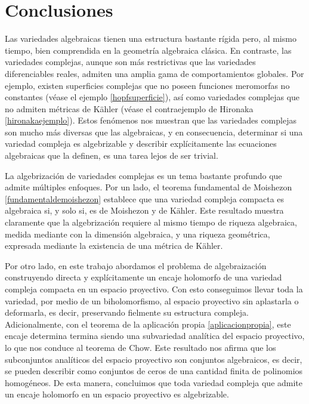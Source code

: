 \chapter*{Conclusiones}

Las variedades algebraicas tienen una estructura bastante rígida pero, al mismo tiempo, bien comprendida en la geometría algebraica clásica. En contraste, las variedades complejas, aunque son más restrictivas que las variedades diferenciables reales, admiten una amplia gama de comportamientos globales. Por ejemplo, existen superficies complejas que no poseen funciones meromorfas no constantes (véase el ejemplo \ref{hopfsuperficie}), así como variedades complejas que no admiten métricas de Kähler (véase el contraejemplo de Hironaka \ref{hironakaejemplo}). Estos fenómenos nos muestran que las variedades complejas son mucho más diversas que las algebraicas, y en consecuencia, determinar si una variedad compleja es algebrizable y describir explícitamente las ecuaciones algebraicas que la definen, es una tarea lejos de ser trivial.

La algebrización de variedades complejas es un tema bastante profundo que admite múltiples enfoques. Por un lado, el teorema fundamental de Moishezon \ref{fundamentaldemoishezon} establece que una variedad compleja compacta es algebraica si, y solo si, es de Moishezon y de Kähler. Este resultado muestra claramente que la algebrización requiere al mismo tiempo de riqueza algebraica, medida mediante con la dimensión algebraica, y una riqueza geométrica, expresada mediante la existencia de una métrica de Kähler.


Por otro lado, en este trabajo abordamos el problema de algebraización construyendo directa y explícitamente un encaje holomorfo de una variedad compleja compacta en un espacio proyectivo. Con esto conseguimos llevar toda la variedad, por medio de un biholomorfismo, al espacio proyectivo sin aplastarla o deformarla, es decir, preservando fielmente su estructura compleja. Adicionalmente, con el teorema de la aplicación propia \ref{aplicacionpropia}, este encaje determina termina siendo una subvariedad analítica del espacio proyectivo, lo que nos conduce al teorema de Chow. Este resultado nos afirma que los subconjuntos analíticos del espacio proyectivo son conjuntos algebraicos, es decir, se pueden describir como conjuntos de ceros de una cantidad finita de polinomios homogéneos. De esta manera, concluimos que toda variedad compleja que admite un encaje holomorfo en un espacio proyectivo es algebrizable.

